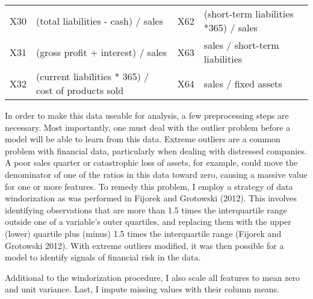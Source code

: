 \documentclass[12pt]{article}  %
\theoremstyle{definition}
\theoremstyle{remark}
\begin{document}
\begin{table}[!h]
{\begin{tabular}{llll}
X30 & (total liabilities - cash) / sales                                                                                       & X62 & (short-term liabilities *365) / sales                                                         \\
X31 & (gross profit + interest) / sales                                                                                        & X63 & sales / short-term liabilities                                                                \\
X32 & (current liabilities * 365) / cost of products sold                                                                      & X64 & sales / fixed assets                                                                          \\ \hline
\end{tabular}}
\end{table}

\par In order to make this data useable for analysis, a few preprocessing steps are necessary. Most importantly, one must deal with the outlier problem before a model will be able to learn from this data. Extreme outliers are a common problem with financial data, particularly when dealing with distressed companies. A poor sales quarter or catastrophic loss of assets, for example, could move the denominator of one of the ratios in this data toward zero, causing a massive value for one or more features. To remedy this problem, I employ a strategy of data windorization as was performed in Fijorek and Grotowski (2012). This involves identifying observations that are more than 1.5 times the interquartile range outside one of a variable's outer quartiles, and replacing them with the upper (lower) quartile plus (minus) 1.5 times the interquartile range (Fijorek and Grotowski 2012). With extreme outliers modified, it was then possible for a model to identify signals of financial risk in the data. 
\par Additional to the windorization procedure, I also scale all features to mean zero and unit variance. Last, I impute missing values with their column means. 
\end{document}
